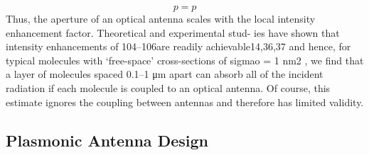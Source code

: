 		\begin{equation}
			p=p
		\end{equation}
		Thus, the aperture of an optical antenna scales with the local intensity enhancement factor. Theoretical and experimental stud- ies have shown that intensity enhancements of 104–106are readily achievable14,36,37 and hence, for typical molecules with ‘free-space’ cross-sections of sigmao = 1 nm2 , we find that a layer of molecules spaced 0.1–1 μm apart can absorb all of the incident radiation if each molecule is coupled to an optical antenna. Of course, this estimate ignores the coupling between antennas and therefore has limited validity.

	\subsection{Plasmonic Antenna Design} \label{sec::structure_antenna}

